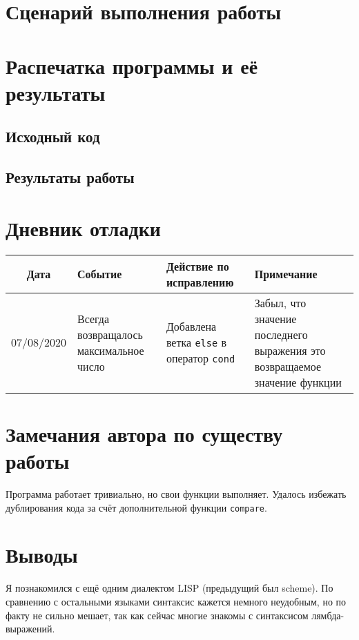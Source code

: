 \documentclass[12pt]{article}
\begin{document}
\section{Сценарий выполнения работы}
\section{Распечатка программы и её результаты}

\subsection{Исходный код}

\subsection{Результаты работы}

\section{Дневник отладки}
\noindent
\begin{tabularx}{\linewidth}{|c|X|X|X|}
\hline
Дата & Событие & Действие по исправлению & Примечание \\
\hline
07/08/2020 & Всегда возвращалось максимальное число & Добавлена ветка {\tt else} в оператор {\tt cond} & Забыл, что значение последнего выражения это возвращаемое значение функции \\
\hline
\end{tabularx}

\section{Замечания автора по существу работы}
Программа работает тривиально, но свои функции выполняет. Удалось избежать дублирования кода за счёт
дополнительной функции {\tt compare}.

\section{Выводы}
Я познакомился с ещё одним диалектом LISP (предыдущий был scheme). По сравнению с остальными языками
синтаксис кажется немного неудобным, но по факту не сильно мешает, так как сейчас многие знакомы с
синтаксисом лямбда-выражений.
\end{document}

